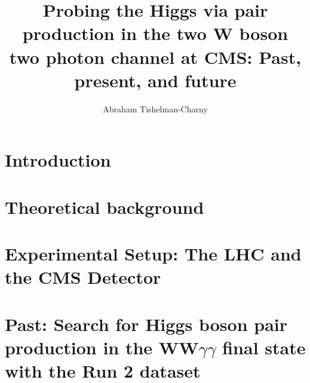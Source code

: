 \documentclass[thesis]{neu}
\title{
Probing the Higgs via pair production in the two W boson two photon channel at CMS: Past, present, and future
}
\author{Abraham Tishelman-Charny}
\begin{document}
\newpage 

 

\setcounter{RenderPreAnalysisSections}{1}

\setcounter{RenderAnalysisSection}{1}

\setcounter{RenderAppendices}{1}


{

    \chapter{Introduction} \label{ch:introduction}
    
    
    \chapter{Theoretical background} \label{chapter:TheoreticalBackground}
    
    
    \chapter{Experimental Setup: The LHC and the CMS Detector} \label{chapter:Experimental_Setup}
    
    

}
{

}

{
    \chapter{Past: Search for Higgs boson pair production in the WW\texorpdfstring{$\gamma\gamma$}{yy} final state with the Run 2 dataset} \label{chapter:HHWWyy}
    
} 
{
}    
\end{document}

